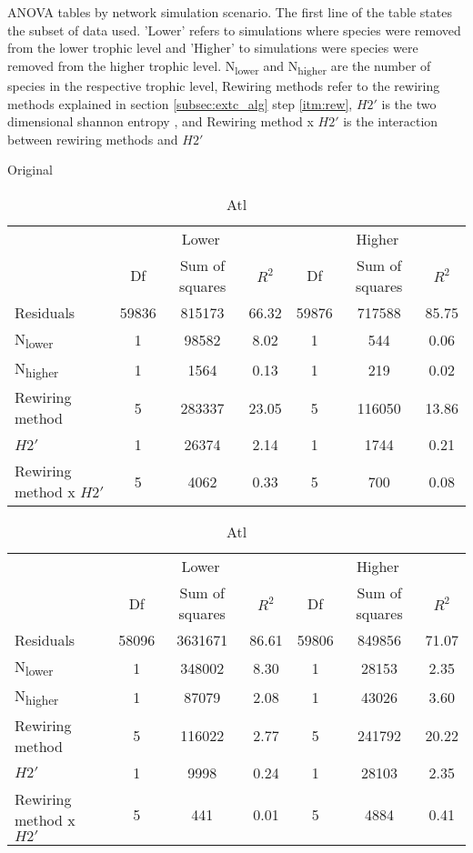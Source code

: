 \documentclass[12pt,a4paper]{article}
\begin{document}
\begin{table}[H]
\label{tab:anova_by_cv}
\caption{ANOVA tables by network simulation scenario. The first line of the table states the subset of data used. 'Lower' refers to simulations where species were removed from the lower trophic level and 'Higher' to simulations were species were removed from the higher trophic level. N\textsubscript{lower} and N\textsubscript{higher} are the number of species in the respective trophic level, Rewiring methods refer to the rewiring methods explained in section \ref{subsec:extc_alg} step \ref{itm:rew}, $H2'$ is the two dimensional shannon entropy \parencite{Bluethgen2006}, and Rewiring method x $H2'$ is the interaction between rewiring methods and $H2'$}
    \begin{subtable}{\linewidth}
    \caption{Original}
    \centering
\begin{tabularx}{\linewidth}{@{} X *6{c} @{}}
\toprule
  & \multicolumn{3}{c}{Lower} & \multicolumn{3}{c}{Higher} \\ \cmidrule(l){2-4} \cmidrule(l){5-7}
  						& Df		& Sum of squares	& $R^2$	& Df 	& Sum of squares	& $R^2$ \\ \midrule
Residuals 				& 59836 & 815173			& 66.32	& 59876 & 717588 		& 85.75   \\
N\textsubscript{lower} 	& 1 		& 98582 			& 8.02 	& 1		& 544 			& 0.06  \\
N\textsubscript{higher} 	& 1 		& 1564 			& 0.13	& 1 		& 219 			& 0.02  \\
Rewiring method 			& 5 		& 283337 		& 23.05 	& 5 		& 116050			& 13.86  \\
$H2'$ 					& 1 		& 26374 			& 2.14 	& 1 		& 1744			& 0.21 \\
Rewiring method x $H2'$ 	& 5 		& 4062 			& 0.33 	& 5 		& 700			& 0.08  \\ \bottomrule
\end{tabularx}
\end{subtable}

\medskip
\begin{subtable}{\linewidth}
\caption{Atl}
\centering
\begin{tabularx}{\linewidth}{@{} X *6{c} @{}}
\toprule
  & \multicolumn{3}{c}{Lower} & \multicolumn{3}{c}{Higher} \\ \cmidrule(l){2-4} \cmidrule(l){5-7}
  						& Df		& Sum of squares	& $R^2$	& Df 	& Sum of squares	& $R^2$ \\ \midrule
Residuals 				& 58096 & 3631671			& 86.61	& 59806 & 849856 		& 71.07   \\
N\textsubscript{lower} 	& 1 		& 348002 		& 8.30 	& 1		& 28153			& 2.35  \\
N\textsubscript{higher} 	& 1 		& 87079 			& 2.08	& 1 		& 43026 			& 3.60  \\
Rewiring method 			& 5 		& 116022			& 2.77 	& 5 		& 241792			& 20.22  \\
$H2'$ 					& 1 		& 9998 			& 0.24 	& 1 		& 28103			& 2.35 \\
Rewiring method x $H2'$ 	& 5 		& 441 			& 0.01 	& 5 		& 4884			& 0.41  \\ \bottomrule
\end{tabularx}
\end{subtable}


\end{table}
\end{document}

